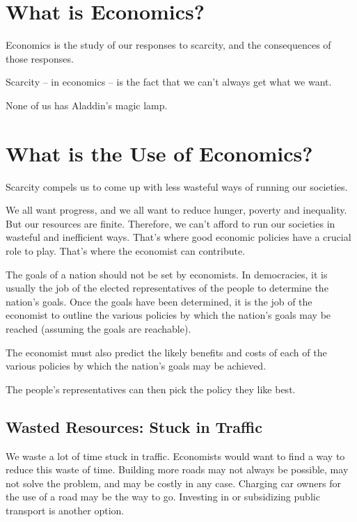 \documentclass[
  letterpaper,
]{book}
\begin{document}
\section{What is Economics?}\label{what-is-economics}

Economics is the study of our responses to scarcity, and the
consequences of those responses.

Scarcity -- in economics -- is the fact that we can't always get what we
want.

None of us has Aladdin's magic lamp.

\section{What is the Use of
Economics?}\label{what-is-the-use-of-economics}

Scarcity compels us to come up with less wasteful ways of running our
societies.

We all want progress, and we all want to reduce hunger, poverty and
inequality. But our resources are finite. Therefore, we can't afford to
run our societies in wasteful and inefficient ways. That's where good
economic policies have a crucial role to play. That's where the
economist can contribute.

The goals of a nation should not be set by economists. In democracies,
it is usually the job of the elected representatives of the people to
determine the nation's goals. Once the goals have been determined, it is
the job of the economist to outline the various policies by which the
nation's goals may be reached (assuming the goals are reachable).

The economist must also predict the likely benefits and costs of each of
the various policies by which the nation's goals may be achieved.

The people's representatives can then pick the policy they like best.

\subsection{Wasted Resources: Stuck in
Traffic}\label{wasted-resources-stuck-in-traffic}

We waste a lot of time stuck in traffic. Economists would want to find a
way to reduce this waste of time. Building more roads may not always be
possible, may not solve the problem, and may be costly in any case.
Charging car owners for the use of a road may be the way to go.
Investing in or subsidizing public transport is another option.
\end{document}
